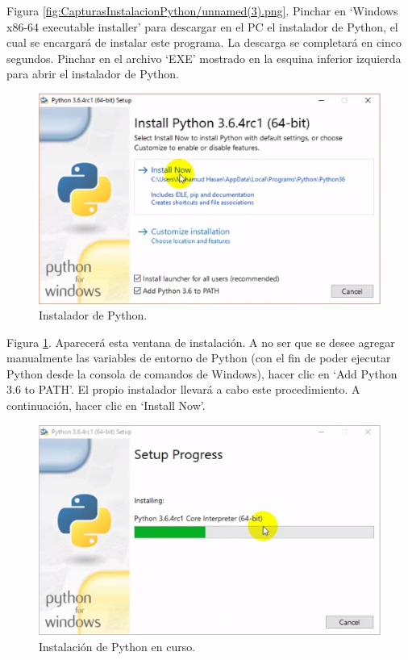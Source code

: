 Figura \ref{fig:CapturasInstalacionPython/unnamed(3).png}. Pinchar en ‘Windows x86-64 executable installer’ para descargar en el PC el instalador de Python, el cual se encargará de instalar este programa. La descarga se completará en cinco segundos. Pinchar en el archivo ‘EXE’ mostrado en la esquina inferior izquierda para abrir el instalador de Python.\\[20pt]

\begin{figure}[h!]
  	\centering
	\includegraphics[width=\textwidth]{CapturasInstalacionPython/unnamed(4).png}
	\caption{Instalador de Python.
	\label{fig:CapturasInstalacionPython/unnamed(4).png}}
\end{figure}

Figura \ref{fig:CapturasInstalacionPython/unnamed(4).png}. Aparecerá esta ventana de instalación. A no ser que se desee agregar manualmente las variables de entorno de Python (con el fin de poder ejecutar Python desde la consola de comandos de Windows), hacer clic en ‘Add Python 3.6 to PATH’. El propio instalador llevará a cabo este procedimiento. A continuación, hacer clic en ‘Install Now’.\\[20pt]

\begin{figure}[h!]
  	\centering
	\includegraphics[width=\textwidth]{CapturasInstalacionPython/unnamed(5).png}
	\caption{Instalación de Python en curso.
	\label{fig:CapturasInstalacionPython/unnamed(5).png}}
\end{figure}

